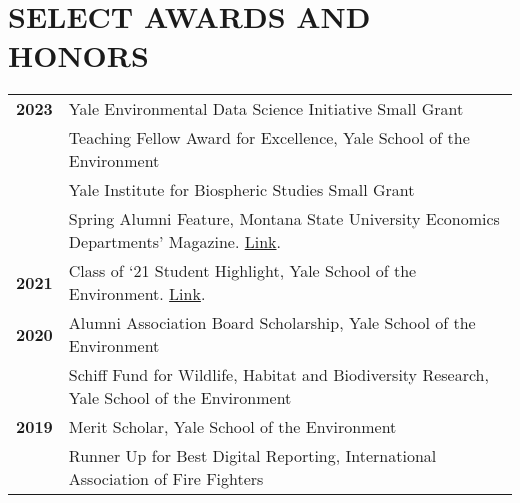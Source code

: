 \documentclass[11pt]{article}
\begin{document}
\section*{SELECT AWARDS AND HONORS}
\begin{tabularx}{\linewidth}{>{\bfseries}r X} %
2023 & Yale Environmental Data Science Initiative Small Grant \\
    & Teaching Fellow Award for Excellence, Yale School of the Environment \\
        & Yale Institute for Biospheric Studies Small Grant \\
        & Spring Alumni Feature, Montana State University Economics Departments’ Magazine. \href{https://www.montana.edu/econ/newsletters/Spring23NewsletterforWeb.pdf}{Link}. \\[1ex]
2021 & Class of ‘21 Student Highlight, Yale School of the Environment. \href{https://environment.yale.edu/news/article/andie-creel-putting-a-value-on-natural-resources?fbclid=IwAR1W1Rz9sNbyTzKgDEBLVM3TMJjhzOWkP5_6f4-cbtQmrNaF4BSW2MLQHGo}{Link}. \\[1ex]
2020 & Alumni Association Board Scholarship, Yale School of the Environment \\
    & Schiff Fund for Wildlife, Habitat and Biodiversity Research, Yale School of the Environment \\[1ex]
2019 & Merit Scholar, Yale School of the Environment \\
    & Runner Up for Best Digital Reporting, International Association of Fire Fighters \\[1ex]

\end{tabularx}
\end{document}

